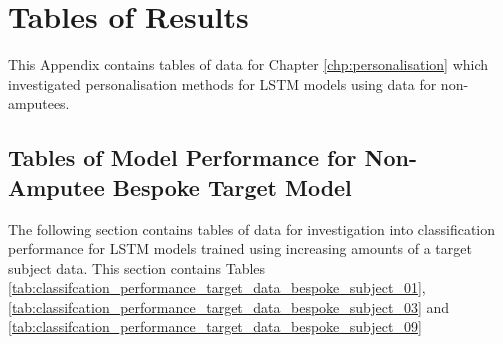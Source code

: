 \chapter{Tables of Results}
\label{chp:tables-of-results}
This Appendix contains tables of data for Chapter \ref{chp:personalisation} which investigated personalisation methods for LSTM models using data for non-amputees.

\section{Tables of Model Performance for Non-Amputee Bespoke Target Model}
\label{sec:appendix-a-model-performance-bespoke}
The following section contains tables of data for investigation into classification performance for LSTM models trained using increasing amounts of a target subject data. This section contains Tables \ref{tab:classifcation_performance_target_data_bespoke_subject_01}, \ref{tab:classifcation_performance_target_data_bespoke_subject_03} and \ref{tab:classifcation_performance_target_data_bespoke_subject_09}
\vfill
\  \\

